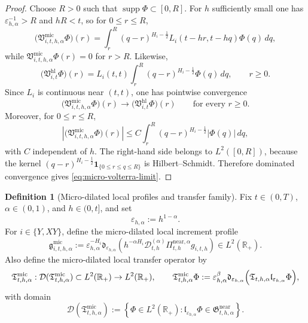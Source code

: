 \documentclass[11pt,a4paper]{amsart}
\theoremstyle{plain}
\theoremstyle{definition}
\newtheorem{definition}[theorem]{Definition}
\theoremstyle{remark}
\newcommand{\R}{\mathbb{R}}
\newcommand{\one}{\mathbf 1}
\begin{document}
\begin{proof}
Choose \(R>0\) such that \(\operatorname{supp}\Phi\subset[0,R]\). For \(h\) sufficiently small one
has \(\varepsilon_{h,\alpha}^{-1}>R\) and \(hR<t\), so for \(0\le r\le R\),
\[
\bigl(\mathfrak V_{i,t,h,\alpha}^{\mathrm{mic}}\Phi\bigr)(r)
=
\int_r^R
(q-r)^{H_i-\frac12}
L_i(t-hr,t-hq)\Phi(q)\,dq,
\]
while \(\mathfrak V_{i,t,h,\alpha}^{\mathrm{mic}}\Phi(r)=0\) for \(r>R\). Likewise,
\[
\bigl(\mathfrak V_{i,t}^{\mathrm{hl}}\Phi\bigr)(r)
=
L_i(t,t)\int_r^R (q-r)^{H_i-\frac12}\Phi(q)\,dq,
\qquad r\ge0.
\]
Since \(L_i\) is continuous near \((t,t)\), one has pointwise convergence
\[
\bigl(\mathfrak V_{i,t,h,\alpha}^{\mathrm{mic}}\Phi\bigr)(r)
\longrightarrow
\bigl(\mathfrak V_{i,t}^{\mathrm{hl}}\Phi\bigr)(r)
\qquad\text{for every }r\ge0.
\]
Moreover, for \(0\le r\le R\),
\[
\left|
\bigl(\mathfrak V_{i,t,h,\alpha}^{\mathrm{mic}}\Phi\bigr)(r)
\right|
\le
C\int_r^R (q-r)^{H_i-\frac12}|\Phi(q)|\,dq,
\]
with \(C\) independent of \(h\). The right-hand side belongs to \(L^2([0,R])\), because the kernel
\((q-r)^{H_i-\frac12}\one_{\{0\le r\le q\le R\}}\) is Hilbert--Schmidt. Therefore dominated
convergence gives \eqref{eq:micro-volterra-limit}.
\end{proof}

\begin{definition}[Micro-dilated local profiles and transfer family]
\label{def:micro-local}
Fix \(t\in(0,T)\), \(\alpha\in(0,1)\), and \(h\in(0,t]\), and set
\[
\varepsilon_{h,\alpha}:=h^{1-\alpha}.
\]
For \(i\in\{Y,XY\}\), define the micro-dilated local increment profile
\begin{equation}\label{eq:micro-profile}
\mathfrak g_{i,t,h,\alpha}^{\mathrm{mic}}
:=
\varepsilon_{h,\alpha}^{-H_i}
\mathfrak d_{\varepsilon_{h,\alpha}}
\left(
h^{-\alpha H_i}
\mathcal D_{t,h}^{(\alpha)}
\Pi_{t,h}^{\mathrm{near},\alpha}g_{i,t,h}
\right)
\in L^2(\R_+).
\end{equation}
Also define the micro-dilated local transfer operator by
\begin{equation}\label{eq:micro-transfer}
\mathfrak T_{t,h,\alpha}^{\mathrm{mic}}:
\mathcal D(\mathfrak T_{t,h,\alpha}^{\mathrm{mic}})\subset L^2(\R_+)\to L^2(\R_+),
\qquad
\mathfrak T_{t,h,\alpha}^{\mathrm{mic}}\Phi
:=
\varepsilon_{h,\alpha}^{\beta}
\mathfrak d_{\varepsilon_{h,\alpha}}
\Bigl(
\mathfrak T_{t,h,\alpha}\mathfrak l_{\varepsilon_{h,\alpha}}\Phi
\Bigr),
\end{equation}
with domain
\[
\mathcal D(\mathfrak T_{t,h,\alpha}^{\mathrm{mic}})
:=
\left\{
\Phi\in L^2(\R_+):
\mathfrak l_{\varepsilon_{h,\alpha}}\Phi\in
\mathfrak G_{t,h,\alpha}^{\mathrm{near}}
\right\}.
\]
\end{definition}
\end{document}
